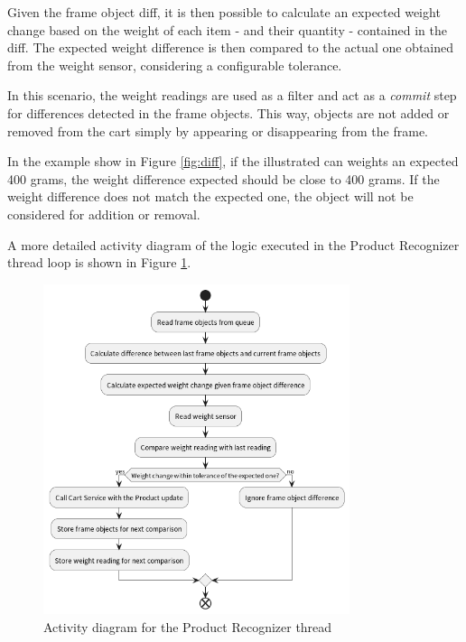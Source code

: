 \documentclass[openright]{normas-utf-tex} %
\begin{document}
Given the frame object diff, it is then possible to calculate an expected
weight change based on the weight of each item - and their quantity - contained
in the diff. The expected weight difference is then compared to the actual
one obtained from the weight sensor, considering a configurable tolerance.

In this scenario, the weight readings are used as a filter and act as a
\textit{commit} step for differences detected in the frame objects. This way, objects are not
added or removed from the cart simply by appearing or disappearing from the frame.

In the example show in Figure \ref{fig:diff}, if the illustrated can weights an expected 400 grams, the weight
difference expected should be close to 400 grams. If the weight difference does not match the expected
one, the object will not be considered for addition or removal. 

A more detailed activity diagram of the logic executed in the Product Recognizer thread loop is
shown in Figure \ref{fig:activity}.

\begin{figure}[H]
	\centering
	\includegraphics[width=0.8\textwidth]{./images/Product Recognizer Activity.png}
	\caption[Activity diagram for the Product Recognizer thread]{Activity diagram for the Product Recognizer thread}
    \label{fig:activity}
\end{figure}
\end{document}
